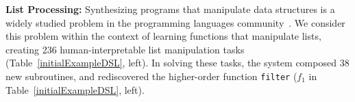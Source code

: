 \documentclass{article}
\newcommand{\code}[1]{{\footnotesize\texttt{#1}}}
\begin{document}
\textbf{List Processing:} Synthesizing programs that manipulate data structures is a widely studied
problem in the programming languages community~\cite{feser2015synthesizing}.
We consider this problem within the context of learning functions that
manipulate lists,
creating 236 human-interpretable list manipulation tasks (Table~\ref{initialExampleDSL}, left).
In solving these tasks, the system
composed 38 new subroutines, and rediscovered the higher-order
function \code{filter} ($f_1$ in Table~\ref{initialExampleDSL}, left).%
\end{document}
